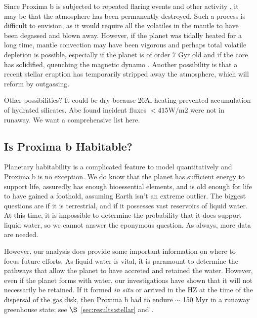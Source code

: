 \documentclass[preprint,12pt]{aastex}
\newcommand{\xxx}[1]{{\color{red} #1}} %
\begin{document}
Since Proxima b is subjected to repeated flaring events and other
activity \citep{Walker81,Davenport16}, it may be that the
atmosphere has been \xxx{permanently} destroyed. Such a process is
difficult to envision, as it would require all the volatiles in the
mantle to have been degassed and blown away. However, if the planet
was tidally heated for a long time, mantle convection may have been
vigorous and perhaps total volatile depletion is possible, especially
if the planet is of order 7 Gyr old and if the core has \xxx{solidified},
quenching the magnetic dynamo \citep{DriscollBarnes15}. Another possibility is that a recent
stellar eruption has temporarily stripped away the atmosphere, which
will reform by outgassing.

\xxx{Other possibilities? It could be dry because 26Al heating prevented accumulation of hydrated silicates. Abe found incident fluxes $< 415$W/m2 were not in runaway. We want a comprehensive list here.}


\subsection{Is Proxima b Habitable?}
\label{sec:results:habitable}

Planetary habitability is a complicated feature to model
quantitatively and Proxima b is no exception. We do know that the
planet has sufficient energy to support life, assuredly has enough
bioessential elements, and is old enough for life to have gained a
foothold, assuming Earth isn't an extreme outlier. The biggest
questions are if it is terrestrial, and if it possesses vast \xxx{reservoirs}
of liquid water. At this time, it is impossible to determine the
probability that it does support liquid water, so we cannot answer the
eponymous question. As always, more data are needed.

However, our analysis does provide some important information on where
to focus future efforts. As liquid water is vital, it is paramount to
determine the pathways that allow the planet to have accreted and
retained the water. However, even if the planet forms with water, our
investigations have shown that it will not necessarily be retained. If
it formed {\it in situ} or arrived in the HZ at the time of the
dispersal of the gas disk, then Proxima b had to endure $\sim$ 150
Myr in a runaway greenhouse state; see $\S$~\ref{sec:results:stellar} and
\cite{LugerBarnes15}.
\end{document}
